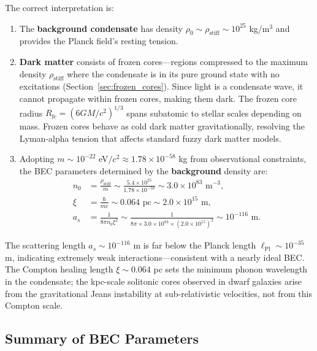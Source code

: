 \documentclass[11pt,a4paper]{article}
\newcommand{\lPl}{\ensuremath{\ell_{\mathrm{Pl}}}}
\newcommand{\rhostiff}{\ensuremath{\rho_{\mathrm{stiff}}}}
\theoremstyle{definition}
\theoremstyle{remark}
\begin{document}
The correct interpretation is:

\begin{enumerate}[leftmargin=*, itemsep=0.2em]
\item The \textbf{background condensate} has density $\rho_0 \sim \rhostiff \sim 10^{25}$ kg/m$^3$ and provides the Planck field's resting tension.

\item \textbf{Dark matter} consists of frozen cores---regions compressed to the maximum density $\rhostiff$ where the condensate is in its pure ground state with no excitations (Section~\ref{sec:frozen_cores}). Since light is a condensate wave, it cannot propagate within frozen cores, making them dark. The frozen core radius $R_{\mathrm{fc}} = (6GM/c^2)^{1/3}$ spans subatomic to stellar scales depending on mass. Frozen cores behave as cold dark matter gravitationally, resolving the Lyman-alpha tension that affects standard fuzzy dark matter models.

\item Adopting $m \sim 10^{-22}$ eV$/c^2 \approx 1.78 \times 10^{-58}$ kg from observational constraints, the BEC parameters determined by the \textbf{background} density are:
\begin{align}
n_0 &= \frac{\rhostiff}{m} \sim \frac{5.4 \times 10^{25}}{1.78 \times 10^{-58}} \sim 3.0 \times 10^{83} \text{ m}^{-3}, \\
\xi &= \frac{\hbar}{mc} \sim 0.064 \text{ pc} \sim 2.0 \times 10^{15} \text{ m}, \\
a_s &= \frac{1}{8\pi n_0 \xi^2} \sim \frac{1}{8\pi \times 3.0 \times 10^{83} \times (2.0 \times 10^{15})^2} \sim 10^{-116} \text{ m}.
\end{align}
\end{enumerate}

The scattering length $a_s \sim 10^{-116}$ m is far below the Planck length $\lPl \sim 10^{-35}$ m, indicating extremely weak interactions---consistent with a nearly ideal BEC. The Compton healing length $\xi \sim 0.064$ pc sets the minimum phonon wavelength in the condensate; the kpc-scale solitonic cores observed in dwarf galaxies arise from the gravitational Jeans instability at sub-relativistic velocities, not from this Compton scale.

\subsection{Summary of BEC Parameters}
\label{sec:bec_params_summary}
\end{document}
